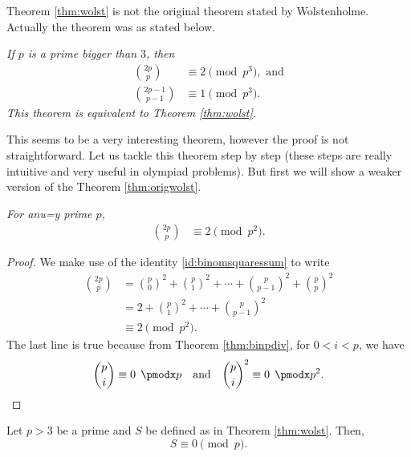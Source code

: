 \documentclass[12pt]{subfile}
\begin{document}
		\begin{remark}
			Theorem \ref{thm:wolst} is not the original theorem stated by Wolstenholme. Actually the theorem was as stated below.
		\end{remark}
	
		\begin{theorem}\slshape\label{thm:origwolst}
			If $p$ is a prime bigger than $3$, then
			\begin{align*}
				\binom{2p}{p} & \equiv2\pmod{p^3}, \text{ and}\\
				\binom{2p-1}{p-1} & \equiv 1 \pmod{p^3}.
			\end{align*}
			This theorem is equivalent to Theorem \ref{thm:wolst}.
		\end{theorem}
	This seems to be a very interesting theorem, however the proof is not straightforward. Let us tackle this theorem step by step (these steps are really intuitive and very useful in olympiad problems). But first we will show a weaker version of the Theorem \ref{thm:origwolst}.
		\begin{theorem}\slshape
			For anu=y prime $p$, 
				\begin{align*}
					\binom{2p}{p} & \equiv2\pmod{p^2}.
				\end{align*}
		\end{theorem}
		
		\begin{proof}
			We make use of the identity \eqref{id:binomsquaressum} to write
				\begin{align*}
					\binom{2p}p & = \binom{p}0^2+\binom{p}{1}^2+\cdots+\binom{p}{p-1}^2+\binom{p}{p}^2\\
								& = 2+\binom{p}{1}^2+\cdots+\binom{p}{p-1}^2\\
								& \equiv2\pmod{p^2}.
				\end{align*}
			The last line is true because from Theorem \ref{thm:binpdiv}, for $0<i<p$, we have
				\begin{equation*}
					\binom{p}{i}  \equiv 0\pmod p \quad \text{and} \quad \binom{p}{i}^2 \equiv 0\pmod{p^2}.
					\qedhere
				\end{equation*}
		\end{proof}
	
		\begin{lemma}\label{lem:wolstproof1}
			Let $p>3$ be a prime and $S$ be defined as in Theorem \ref{thm:wolst}. Then, $$S \equiv 0 \pmod p.$$
		\end{lemma}
		
\end{document}
